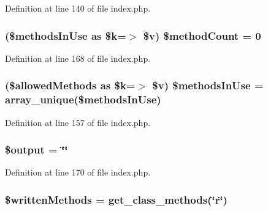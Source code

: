 Definition at line 140 of file index.\-php.

\hypertarget{index_8php_a56c1b7384519355df73a254a12f0bae3}{
\subsubsection[{\$method\-Count}]{ (\$methods\-In\-Use as \$k=$>$ \$v) \$method\-Count = 0}}\label{index_8php_a56c1b7384519355df73a254a12f0bae3}


Definition at line 168 of file index.\-php.

\hypertarget{index_8php_a1c475c0c53206fb15c4c3028bb7d5c7c}{
\subsubsection[{\$methods\-In\-Use}]{ (\$allowed\-Methods as \$k=$>$ \$v) \$methods\-In\-Use = array\-\_\-unique(\$methods\-In\-Use)}}\label{index_8php_a1c475c0c53206fb15c4c3028bb7d5c7c}


Definition at line 157 of file index.\-php.

\hypertarget{index_8php_a73004ce9cd673c1bfafd1dc351134797}{
\subsubsection[{\$output}]{\setlength{\rightskip}{0pt plus 5cm}\$output = \char`\"{}\char`\"{}}}\label{index_8php_a73004ce9cd673c1bfafd1dc351134797}


Definition at line 170 of file index.\-php.

\hypertarget{index_8php_a2e64f0494f7eccf90168af7f67198650}{
\subsubsection[{\$written\-Methods}]{\setlength{\rightskip}{0pt plus 5cm}\$written\-Methods = get\-\_\-class\-\_\-methods(\char`\"{}r\char`\"{})}}\label{index_8php_a2e64f0494f7eccf90168af7f67198650}



